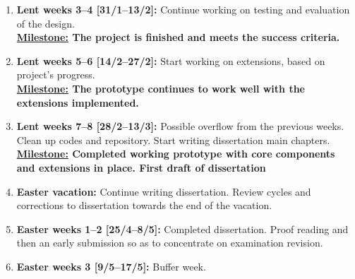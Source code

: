 \begin{enumerate}
	\item \textbf{Lent weeks 3--4 [31/1--13/2]:} Continue working on testing and evaluation of the design.
	\\
	\textbf{\underline{Milestone:} The project is finished and meets the success criteria.}
	
	\item \textbf{Lent weeks 5--6 [14/2--27/2]:} Start working on extensions, based on project's progress.
	\\
	\textbf{\underline{Milestone:} The prototype continues to work well with the extensions implemented.}
	
	\item \textbf{Lent weeks 7--8 [28/2--13/3]:} Possible overflow from the previous weeks. Clean up codes and repository. Start writing dissertation main chapters.
	\\
	\textbf{\underline{Milestone:} Completed working prototype with core components and extensions in place. First draft of dissertation}
	
	\item \textbf{Easter vacation:} Continue writing dissertation. Review cycles and corrections to dissertation towards the end of the vacation.
	
	\item \textbf{Easter weeks 1--2 [25/4--8/5]:}  Completed dissertation. Proof reading and then an early submission so as to concentrate on examination revision.
	
	\item \textbf{Easter weeks 3 [9/5--17/5]:} Buffer week.
\end{enumerate}